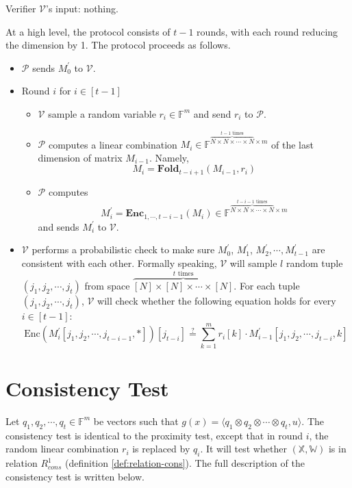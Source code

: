 Verifier $\mathcal{V}$'s input: nothing.

At a high level, the protocol consists of $t-1$ rounds, with each round reducing the dimension by 1. The protocol proceeds as follows. 

\begin{itemize}
    \item $\mathcal{P}$ sends $M_0^{\prime}$ to $\mathcal{V}$.
    
    \item Round $i$ for $i \in [t-1]$
    
    \begin{itemize}
        \item $\mathcal{V}$ sample a random variable $r_i \in \mathbb{F}^m$ and send $r_i$ to $\mathcal{P}$.
        \item $\mathcal{P}$ computes a linear combination 
        $M_i \in \mathbb{F}^{\overbrace{N \times N \times \cdots \times N}^{t-1 \text{ times}} \times m}$ of the last dimension of matrix $M_{i-1}$.
        Namely,
$$
    M_i = \textbf{Fold}_{t-i+1}(M_{i-1}, r_i)
$$

        \item $\mathcal{P}$ computes 
$$
    M_i^\prime =  \textbf{Enc}_{1,\cdots,t-i-1}(M_i)\in \mathbb{F}^{\overbrace{N \times N \times \cdots \times N}^{t-i-1 \text{ times}} \times m}
$$    
        and sends $M_i^\prime$ to $\mathcal{V}$.
    \end{itemize}
    
    \item $\mathcal{V}$ performs a probabilistic check to make sure $M_0^\prime$, $M_1^\prime$, $M_2^\prime, \cdots, M_{t-1}^\prime$ are consistent with each other. Formally speaking, $\mathcal{V}$ will sample $l$ random tuple $(j_1, j_2, \cdots, j_t)$ from space $\overbrace{[N] \times [N] \times \cdots \times [N]}^{t \text{ times}}$. 
    For each tuple $(j_1, j_2, \cdots, j_t)$, 
    $\mathcal{V}$ will check whether the following equation holds for every $i \in [t-1]$:
$$
    \text{Enc}(M_i^\prime[j_1, j_2, \cdots, j_{t-i-1}, *])[j_{t-i}] \stackrel{?}{=} \sum_{k=1}^m r_i[k] \cdot M_{i-1}^{\prime}[j_1,j_2, \cdots, j_{t-i},k]
$$
\end{itemize}

\section{Consistency Test}

Let $q_1, q_2, \cdots, q_t \in \mathbb{F}^{m}$ be vectors such that $g(x) =\langle q_1 \otimes q_2 \otimes \cdots \otimes q_t, u \rangle $. The consistency test is identical to the proximity test, except that in round $i$, the random linear combination $r_i$ is replaced by $q_i$. It will test whether $(\mathbb{X}, \mathbb{W})$ is in relation $R_{cons}^1$ (definition \ref{def:relation-cons}). The full description of the consistency test is written below.

